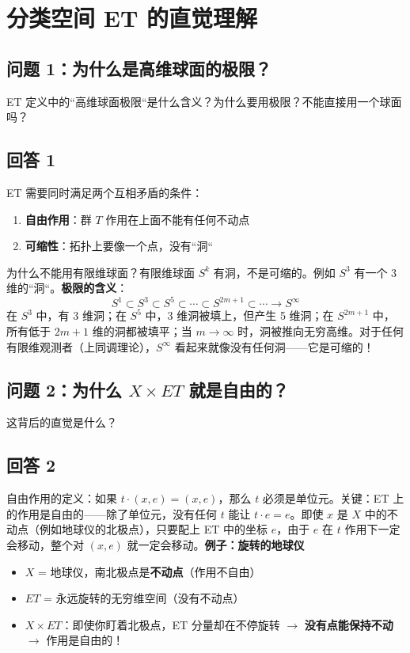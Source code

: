\section{分类空间 ET 的直觉理解}\label{sec:ET intuition}
\subsection{问题 1：为什么是高维球面的极限？}ET 定义中的``高维球面极限``是什么含义？为什么要用极限？不能直接用一个球面吗？
\subsection{回答 1}ET 需要同时满足两个互相矛盾的条件：
\begin{enumerate}
\item \textbf{自由作用}：群 $T$ 作用在上面不能有任何不动点
\item \textbf{可缩性}：拓扑上要像一个点，没有``洞``
\end{enumerate}为什么不能用有限维球面？有限维球面 $S^k$ 有洞，不是可缩的。例如 $S^3$ 有一个 3 维的``洞``。\textbf{极限的含义}：$$S^1 \subset S^3 \subset S^5 \subset \cdots \subset S^{2m+1} \subset \cdots \to S^\infty$$在 $S^3$ 中，有 3 维洞；在 $S^5$ 中，3 维洞被填上，但产生 5 维洞；在 $S^{2m+1}$ 中，所有低于 $2m+1$ 维的洞都被填平；当 $m \to \infty$ 时，洞被推向无穷高维。对于任何有限维观测者（上同调理论），$S^\infty$ 看起来就像没有任何洞——它是可缩的！
\subsection{问题 2：为什么 $X \times ET$ 就是自由的？}这背后的直觉是什么？
\subsection{回答 2}自由作用的定义：如果 $t \cdot (x,e) = (x,e)$，那么 $t$ 必须是单位元。关键：ET 上的作用是自由的——除了单位元，没有任何 $t$ 能让 $t \cdot e = e$。即使 $x$ 是 $X$ 中的不动点（例如地球仪的北极点），只要配上 ET 中的坐标 $e$，由于 $e$ 在 $t$ 作用下一定会移动，整个对 $(x,e)$ 就一定会移动。\textbf{例子：旋转的地球仪}
\begin{itemize}
\item $X$ = 地球仪，南北极点是\textbf{不动点}（作用不自由）
\item $ET$ = 永远旋转的无穷维空间（没有不动点）
\item $X \times ET$：即使你盯着北极点，ET 分量却在不停旋转 $\rightarrow$ \textbf{没有点能保持不动} $\rightarrow$ 作用是自由的！
\end{itemize}

